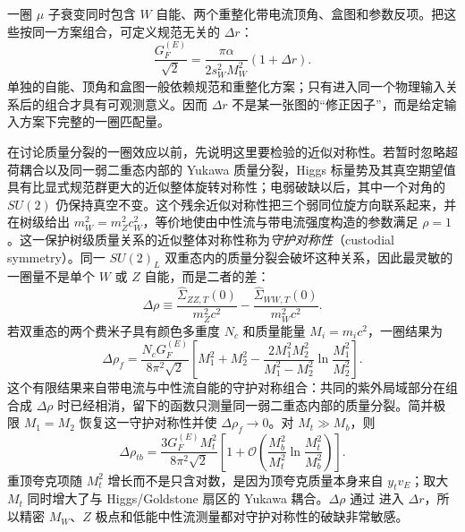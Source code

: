 一圈 $\mu$ 子衰变同时包含 $W$ 自能、两个重整化带电流顶角、盒图和参数反项。把这些按同一方案组合，可定义规范无关的 $\Delta r$：
\begin{equation}
\boxed{
\frac{G_F^{(E)}}{\sqrt2}
=\frac{\pi\alpha}{2s_W^2M_W^2}(1+\Delta r).}
\label{eq:delta-r-definition-dp11}
\end{equation}
单独的自能、顶角和盒图一般依赖规范和重整化方案；只有进入同一个物理输入关系后的组合才具有可观测意义。因而 $\Delta r$ 不是某一张图的“修正因子”，而是给定输入方案下完整的一圈匹配量。

在讨论质量分裂的一圈效应以前，先说明这里要检验的近似对称性。若暂时忽略超荷耦合以及同一弱二重态内部的 Yukawa 质量分裂，Higgs 标量势及其真空期望值具有比显式规范群更大的近似整体旋转对称性；电弱破缺以后，其中一个对角的 $SU(2)$ 仍保持真空不变。这个残余近似对称性把三个弱同位旋方向联系起来，并在树级给出 $m_W^2=m_Z^2c_W^2$，等价地使由中性流与带电流强度构造的参数满足 $\rho=1$。这一保护树级质量关系的近似整体对称性称为\emph{守护对称性}（custodial symmetry）。同一 $SU(2)_L$ 双重态内的质量分裂会破坏这种关系，因此最灵敏的一圈量不是单个 $W$ 或 $Z$ 自能，而是二者的差：
\begin{equation}
\Delta\rho
\equiv
\frac{\widehat\Sigma_{ZZ,T}(0)}{m_Z^2c^2}
-\frac{\widehat\Sigma_{WW,T}(0)}{m_W^2c^2}.
\label{eq:delta-rho-definition-dp11}
\end{equation}
若双重态的两个费米子具有颜色多重度 $N_c$ 和质量能量 $M_i=m_ic^2$，一圈结果为
\begin{equation}
\boxed{
\Delta\rho_f
=\frac{N_cG_F^{(E)}}{8\pi^2\sqrt2}
\left[
M_1^2+M_2^2
-\frac{2M_1^2M_2^2}{M_1^2-M_2^2}
\ln\frac{M_1^2}{M_2^2}
\right].}
\label{eq:delta-rho-doublet-dp11}
\end{equation}
这个有限结果来自带电流与中性流自能的守护对称组合：共同的紫外局域部分在组合成 $\Delta\rho$ 时已经相消，留下的函数只测量同一弱二重态内部的质量分裂。简并极限 $M_1=M_2$ 恢复这一守护对称性并使 $\Delta\rho_f\to0$。对 $M_t\gg M_b$，则
\begin{equation}
\boxed{
\Delta\rho_{tb}
=\frac{3G_F^{(E)}M_t^2}{8\pi^2\sqrt2}
\left[
1+\mathcal O\!\left(
\frac{M_b^2}{M_t^2}\ln\frac{M_t^2}{M_b^2}
\right)
\right].}
\label{eq:delta-rho-top-dp11}
\end{equation}
重顶夸克项随 $M_t^2$ 增长而不是只含对数，是因为顶夸克质量本身来自 $y_t v_E$；取大 $M_t$ 同时增大了与 Higgs/Goldstone 扇区的 Yukawa 耦合。$\Delta\rho$ 通过 进入 $\Delta r$，所以精密 $M_W$、$Z$ 极点和低能中性流测量都对守护对称性的破缺非常敏感。
